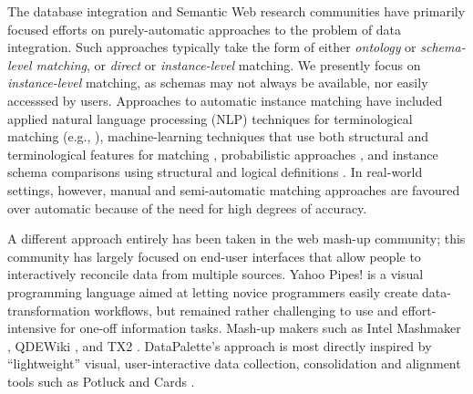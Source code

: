 \documentclass{sigchi}
\begin{document}
The database integration and Semantic Web \cite{Shadbolt:2006:SWR:1155313.1155373} research communities have primarily focused efforts on purely-automatic approaches to the problem of data integration.  Such approaches typically take the form of either \emph{ontology} or \emph{schema-level matching}, or \emph{direct} or \emph{instance-level} matching.  We presently focus  on \emph{instance-level} matching, as schemas may not always be available, nor easily accesssed by users. Approaches to automatic instance matching have included applied natural language processing (NLP) techniques for terminological matching (e.g., \cite{euzenat2004api}), machine-learning techniques that use both structural and terminological features for matching \cite{doan2003learning}, probabilistic approaches \cite{suchanek2011paris}, and instance schema comparisons using structural and logical definitions \cite{castano2006matching}.   In real-world settings, however, manual and semi-automatic matching approaches are favoured over automatic because of the need for high degrees of accuracy.  

A different approach entirely has been taken in the web mash-up community; this community has largely focused on end-user interfaces that allow people to interactively reconcile data from multiple sources.  Yahoo Pipes! is a visual programming language aimed at letting novice programmers easily create data-transformation workflows, but remained rather challenging to  use and effort-intensive for one-off information tasks.  Mash-up makers such as Intel Mashmaker \cite{}, QDEWiki \cite{}, and TX2 \cite{}. DataPalette's approach is most directly inspired by ``lightweight'' visual, user-interactive data collection, consolidation and alignment tools such as Potluck \cite{citeulike:3875264} and Cards \cite{Dontcheva:2007:RCS:1294211.1294224}.

\end{document}
